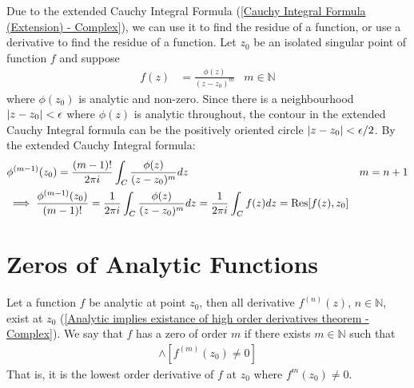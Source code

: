 \documentclass[12pt, english]{book}
\begin{document}
	\begin{example} 
		Due to the extended Cauchy Integral Formula (\cref{Cauchy Integral Formula (Extension) - Complex}), we can use it to find the residue of a function, or use a derivative to find the residue of a function. Let \(z_0\) be an isolated singular point of function \(f\) and suppose
		\begin{align*}
			f(z) &= \frac{\phi(z)}{(z-z_0)^m}	& 	m \in \mathbb{N}
		\end{align*}
		where \(\phi(z_0)\) is analytic and non-zero. Since there is a neighbourhood \(\abs{z-z_0}<\epsilon\) where \(\phi(z)\) is analytic throughout, the contour in the extended Cauchy Integral formula can be the positively oriented circle \(\abs{z-z_0}< \epsilon/2\). By the extended Cauchy Integral formula:
		\begin{align*}
			&\phi^{(m-1)}(z_0) = \frac{(m-1)!}{2\pi i} \int_{C} \frac{\phi(z)}{(z-z_0)^m} dz 	& m=n+1\\
			&\implies \frac{\phi^{(m-1)}(z_0)}{(m-1)!} 
				= \frac{1}{2\pi i} \int_{C} \frac{\phi(z)}{(z-z_0)^{m}} dz
				= \frac{1}{2\pi i} \int_{C} f(z) dz
				= \Res[f(z),z_0]
		\end{align*}
	\end{example}

	\section{Zeros of Analytic Functions} \label{Zeros of Analytic Functions Section - Complex}
	
	\begin{definition}
		\label{Zero of Order m Definition - Complex}
		Let a function \(f\) be analytic at point \(z_0\), then all derivative \(f^{(n)}(z)\), \(n\in \mathbb{N}\), exist at \(z_0\) (\cref{Analytic implies existance of high order derivatives theorem - Complex}). We say that \(f\) has a zero of order \(m\) if there exists \(m\in \mathbb{N}\) such that 
		\begin{align*}
			[f(z_0) = f'(z_0) = f''(z_0) = \cdots = f^{(m-1)}(z_0) = 0] 
			\land [f^{(m)}(z_0) \neq 0]
		\end{align*}
		That is, it is the lowest order derivative of \(f\) at \(z_0\) where \(f^{m}(z_0) \neq 0\).
	\end{definition}
\end{document}
